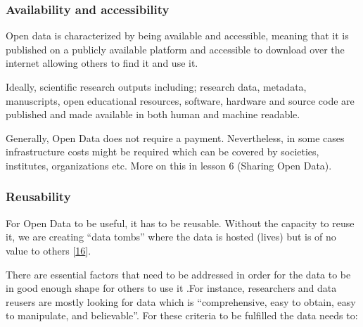 \documentclass[
  letterpaper,
  DIV=11,
  numbers=noendperiod]{scrreport}
\begin{document}
\hypertarget{availability-and-accessibility}{%
\subsubsection*{Availability and
accessibility}\label{availability-and-accessibility}}

Open data is characterized by being available and accessible, meaning
that it is published on a publicly available platform and accessible to
download over the internet allowing others to find it and use it.

Ideally, scientific research outputs including; research data, metadata,
manuscripts, open educational resources, software, hardware and source
code are published and made available in both human and machine
readable.

Generally, Open Data does not require a payment. Nevertheless, in some
cases infrastructure costs might be required which can be covered by
societies, institutes, organizations etc. More on this in lesson 6
(Sharing Open Data).

\hypertarget{reusability}{%
\subsubsection*{Reusability}\label{reusability}}

For Open Data to be useful, it has to be reusable. Without the capacity
to reuse it, we are creating ``data tombs'' where the data is hosted
(lives) but is of no value to others {[}\href{}{16}{]}.

There are essential factors that need to be addressed in order for the
data to be in good enough shape for others to use it .For instance,
researchers and data reusers are mostly looking for data which is
``comprehensive, easy to obtain, easy to manipulate, and believable''.
For these criteria to be fulfilled the data needs to:
\end{document}
